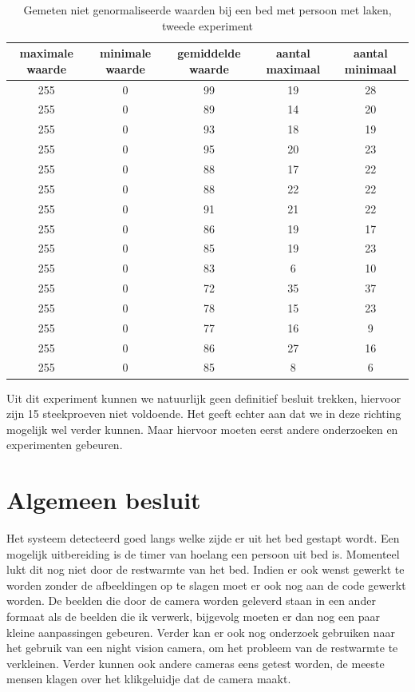 \begin{table}[h]
	\begin{tabular}{|c|c|c|c|c|}
		\hline
		maximale waarde & minimale waarde & gemiddelde waarde & aantal maximaal & aantal minimaal \\ \hline
		255 & 0 & 99 & 19 & 28 \\ \hline
		255 & 0 & 89 & 14 & 20 \\ \hline
		255 & 0 & 93 & 18 & 19 \\ \hline
		255 & 0 & 95 & 20 & 23 \\ \hline
		255 & 0 & 88 & 17 & 22 \\ \hline
		255 & 0 & 88 & 22 & 22 \\ \hline
		255 & 0 & 91 & 21 & 22 \\ \hline
		255 & 0 & 86 & 19 & 17 \\ \hline
		255 & 0 & 85 & 19 & 23 \\ \hline
		255 & 0 & 83 & 6  & 10 \\ \hline
		255 & 0 & 72 & 35 & 37 \\ \hline
		255 & 0 & 78 & 15 & 23 \\ \hline
		255 & 0 & 77 & 16 & 9  \\ \hline
		255 & 0 & 86 & 27 & 16 \\ \hline
		255 & 0 & 85 & 8  & 6  \\ \hline
	\end{tabular}
	\caption{Gemeten niet genormaliseerde waarden bij een bed met persoon met laken, tweede experiment}
	\label{refTabPZNPL}
\end{table}
Uit dit experiment kunnen we natuurlijk geen definitief besluit trekken, hiervoor zijn 15 steekproeven niet voldoende. Het geeft echter aan dat we in deze richting mogelijk wel verder kunnen. Maar hiervoor moeten eerst andere onderzoeken en experimenten gebeuren. 
\chapter{Algemeen besluit}
Het systeem detecteerd goed langs welke zijde er uit het bed gestapt wordt. Een mogelijk uitbereiding is de timer van hoelang een persoon uit bed is. Momenteel lukt dit nog niet door de restwarmte van het bed. Indien er ook wenst gewerkt te worden zonder de afbeeldingen op te slagen moet er ook nog aan de code gewerkt worden. De beelden die door de camera worden geleverd staan in een ander formaat als de beelden die ik verwerk, bijgevolg moeten er dan nog een paar kleine aanpassingen gebeuren. Verder kan er ook nog onderzoek gebruiken naar het gebruik van een night vision camera, om het probleem van de restwarmte te verkleinen. Verder kunnen ook andere cameras eens getest worden, de meeste mensen klagen over het klikgeluidje dat de camera maakt.